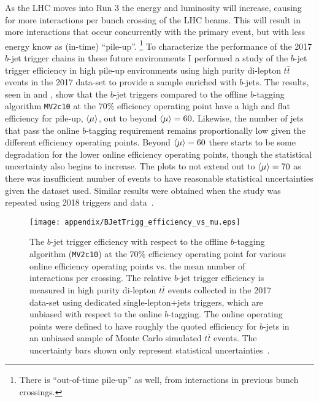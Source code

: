As the LHC moves into Run 3 the energy and luminosity will increase, causing for more interactions per bunch crossing of the LHC beams.
This will result in more interactions that occur concurrently with the primary event, but with less energy know as (in-time) ``pile-up''.%
\footnote{There is ``out-of-time pile-up'' as well, from interactions in previous bunch crossings.}
To characterize the performance of the 2017 $b$-jet trigger chains in these future environments I performed a study of the $b$-jet trigger efficiency in high pile-up environments using high purity di-lepton $t\bar{t}$ events in the 2017 data-set to provide a sample enriched with $b$-jets.
The results, seen in  and , show that the $b$-jet triggers compared to the offline $b$-tagging algorithm \texttt{MV2c10} at the $70\%$ efficiency operating point have a high and flat efficiency for pile-up, $\braket{\mu}$, out to beyond $\braket{\mu}=60$.
Likewise, the number of jets that pass the online $b$-tagging requirement remains proportionally low given the different efficiency operating points.
Beyond $\braket{\mu}=60$ there starts to be some degradation for the lower online efficiency operating points, though the statistical uncertainty also begins to increase.
The plots to not extend out to $\braket{\mu}=70$ as there was insufficient number of events to have reasonable statistical uncertainties given the dataset used.
Similar results were obtained when the study was repeated using 2018 triggers and data~\cite{Sekula:2631805}.

\begin{figure}[htbp]
 \centering
 \texttt{[image: appendix/BJetTrigg\_efficiency\_vs\_mu.eps]}
 \caption[The $b$-jet trigger efficiency with respect to the offline $b$-tagging algorithm (\texttt{MV2c10}) at the 70\% efficiency operating point for various online efficiency operating points vs. the mean number of interactions per crossing.]{%
  The $b$-jet trigger efficiency with respect to the offline $b$-tagging algorithm (\texttt{MV2c10}) at the 70\% efficiency operating point for various online efficiency operating points vs. the mean number of interactions per crossing.
  The relative $b$-jet trigger efficiency is measured in high purity di-lepton $t\bar{t}$ events collected in the 2017 data-set using dedicated single-lepton$+$jets triggers, which are unbiased with respect to the online $b$-tagging.
  The online operating points were defined to have roughly the quoted efficiency for $b$-jets in an unbiased sample of Monte Carlo simulated $t\bar{t}$ events.
  The uncertainty bars shown only represent statistical uncertainties~\cite{Feickert:2294576}.}
 \label{fig:BJetTrigg_efficiency_vs_mu}
\end{figure}

